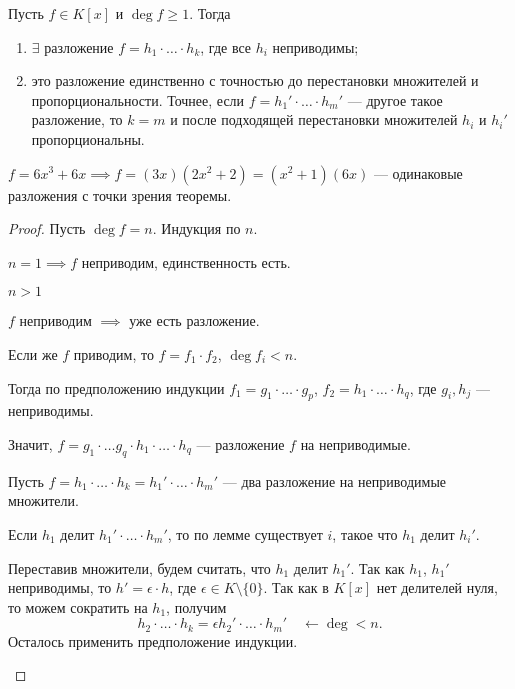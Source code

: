 \begin{theorem}
    Пусть $f \in K[x]$ и $\deg f \geq 1$.
    Тогда
    \begin{enumerate}
    \item $\exists$ разложение $f = h_1 \cdot \ldots \cdot h_k$, где все $h_i$ неприводимы;
    \item это разложение единственно с точностью до перестановки множителей и пропорциональности. Точнее, если $f = h_1' \cdot \ldots \cdot h_m'$ --- другое такое разложение, то $k = m$ и после подходящей перестановки множителей $h_i$ и $h_i'$ пропорциональны.
    \end{enumerate}
\end{theorem}

\begin{example}
    $f = 6x^3 + 6x \implies f = (3x)(2x^2 + 2) = (x^2 + 1)(6x)$ --- одинаковые разложения с точки зрения теоремы.
\end{example}

\begin{proof}
    Пусть $\deg f = n$. Индукция по $n$.

    $n = 1 \implies f$ неприводим, единственность есть.

    \bigskip
    $n > 1$
    \begin{description}[labelindent=2\parindent,leftmargin=3\parindent]
    \item[Существование] $f$ неприводим $ \implies $ уже есть разложение.

        Если же $f$ приводим, то $f = f_1 \cdot f_2$, $\deg f_i < n$.

        Тогда по предположению индукции $f_1 = g_1 \cdot \ldots \cdot g_p$, $f_2 = h_1 \cdot \ldots \cdot h_q$, где $g_i, h_j$ --- неприводимы.

        Значит, $f = g_1 \cdot \ldots g_q \cdot h_1 \cdot \ldots \cdot h_q$ --- разложение $f$ на неприводимые.

    \item[Единственность] Пусть $f = h_1 \cdot \ldots \cdot h_k = h_1' \cdot \ldots \cdot h_m'$ --- два разложение на неприводимые множители.

        Если $h_1$ делит $h_1' \cdot \ldots \cdot h_m'$, то по лемме существует $i$, такое что $h_1$ делит $h_i'$.

        Переставив множители, будем считать, что $h_1$ делит $h_1'$. Так как $h_1$, $h_1'$ неприводимы, то $h' = \epsilon \cdot h$, где $\epsilon \in K \setminus \{0\}$. Так как в $K[x]$ нет делителей нуля, то можем сократить на $h_1$, получим
        \begin{equation*}
            h_2 \cdot \ldots \cdot h_k = \epsilon h_2' \cdot \ldots \cdot h_m' \quad \leftarrow \deg < n
        .\end{equation*}
        Осталось применить предположение индукции.
        \qedhere
    \end{description}
\end{proof}

\begin{comment}~
    \begin{enumerate}
    \item Всякое КГИ факториально;
    \item $K[x_1, \dots, x_n]$, $n \geq 2$ --- это не КГИ, но тоже факториально.
    \end{enumerate}
\end{comment}
